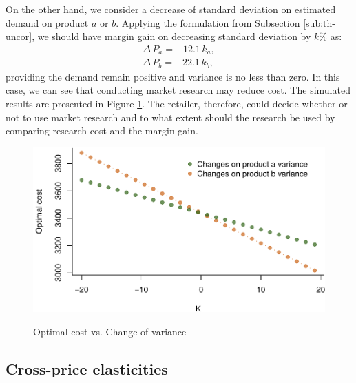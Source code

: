 \documentclass[a4paper,11pt]{article}
\begin{document}
On the other hand, we consider a decrease of standard deviation on estimated demand on product $a$ or $b$. Applying the formulation from Subsection \ref{sub:th-uncor}, we should have margin gain on decreasing standard deviation by $k\%$ as:
\[
\begin{aligned}
    \Delta \, P_a = -12.1 \, k_a,\\
    \Delta \, P_b = -22.1 \, k_b,
\end{aligned}
\]
providing the demand remain positive and variance is no less than zero. In this case, we can see that conducting market research may reduce cost. The simulated results are presented in Figure \ref{fig:var}. The retailer, therefore, could decide whether or not to use market research and to what extent should the research be used by comparing research cost and the margin gain.
\begin{figure}[htb]
\centering
\caption{Optimal cost vs. Change of variance}
\includegraphics{Example-figure_files/figure-latex/var-1.pdf}
\label{fig:var}
\end{figure}

\subsection{Cross-price elasticities} \label{sub:app2}
\end{document}
